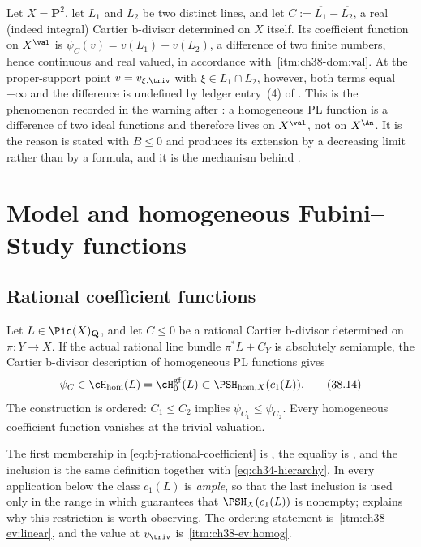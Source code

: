 \begin{example}
\label{ex:ch38-fractional-undefined}
Let $X=\mathbf P^2$, let $L_1$ and $L_2$ be two distinct lines, and
let $C:=\overline{L_1}-\overline{L_2}$, a real (indeed integral) Cartier
b-divisor determined on $X$ itself.  Its coefficient function on
$X^{\val}$ is $\psi_C(v)=v(L_1)-v(L_2)$, a difference of two finite
numbers, hence continuous and real valued, in accordance with
\,\cref{itm:ch38-dom:val}.  At the
proper-support point $v=v_{\xi,\triv}$ with
$\xi\in L_1\cap L_2$, however, both terms equal $+\infty$ and the
difference is undefined by ledger entry~(4) of
.  This is the phenomenon recorded in the
warning after : a homogeneous PL function
is a difference of two ideal functions and therefore lives on
$X^{\val}$, not on $X^{\An}$.  It is the reason
 is stated with $B\leq0$ and
produces its extension by a decreasing limit rather than by a formula, and
it is the mechanism behind
.
\end{example}

\section{Model and homogeneous Fubini--Study functions}
\label{sec:ch38-model-fs}

\subsection{Rational coefficient functions}
\label{sec:ch38-rational-coefficients}

Let $L\in\Pic(X)_{\mathbf Q}$, and let $C\le0$ be a rational Cartier
b-divisor determined on $\pi:Y\to X$.  If the actual rational line bundle
$\pi^*L+C_Y$ is absolutely semiample, the Cartier b-divisor description
of homogeneous PL functions gives
\[
 \psi_C\in\cH_{\mathrm{hom}}(L)
       =\cH^{\mathrm{gf}}_0(L)
       \subset\PSH_{\mathrm{hom},X}(c_1(L)).
\tag{38.14}\label{eq:bj-rational-coefficient}
\]
The construction is ordered: $C_1\le C_2$ implies
$\psi_{C_1}\le\psi_{C_2}$.  Every homogeneous coefficient function
vanishes at the trivial valuation.

The first membership in \eqref{eq:bj-rational-coefficient} is
, the equality is
, and the inclusion is the same definition
together with \eqref{eq:ch34-hierarchy}.  In every application below the
class $c_1(L)$ is \emph{ample}, so that the last inclusion is used only
in the range in which  guarantees that
$\PSH_X(c_1(L))$ is nonempty;  explains why
this restriction is worth observing.  The ordering statement is
\,\cref{itm:ch38-ev:linear}, and the
value at $v_{\triv}$ is
\,\cref{itm:ch38-ev:homog}.


